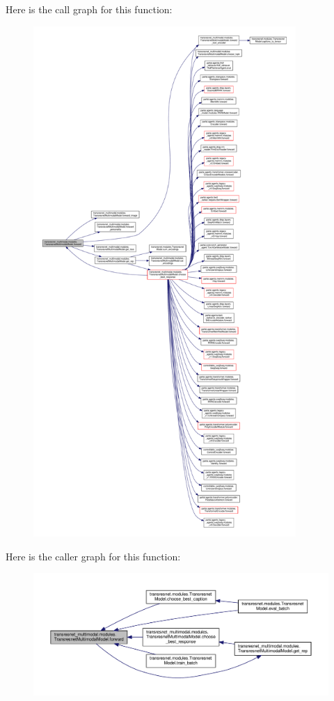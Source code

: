 Here is the call graph for this function\+:
\nopagebreak
\begin{figure}[H]
\begin{center}
\leavevmode
\includegraphics[height=550pt]{classtransresnet__multimodal_1_1modules_1_1TransresnetMultimodalModel_af21e163c4c9d044d575d3bdb02410d9e_cgraph}
\end{center}
\end{figure}
Here is the caller graph for this function\+:
\nopagebreak
\begin{figure}[H]
\begin{center}
\leavevmode
\includegraphics[width=350pt]{classtransresnet__multimodal_1_1modules_1_1TransresnetMultimodalModel_af21e163c4c9d044d575d3bdb02410d9e_icgraph}
\end{center}
\end{figure}
